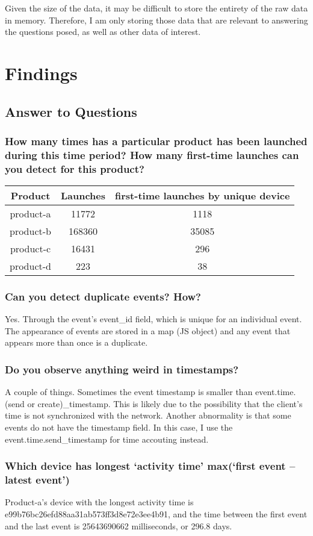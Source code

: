 \documentclass[12pt,letter]{article}
\begin{document}
  Given the size of the data, it may be difficult to store the entirety of the
  raw data in memory. Therefore, I am only storing those data that are relevant
  to answering the questions posed, as well as other data of interest.

  \section{Findings}
  \subsection{Answer to Questions}
  \subsubsection{How many times has a particular product has been launched during this time
  period? How many first-time launches can you detect for this product?}
  \begin{tabular}{c| c c}
      Product & Launches & first-time launches by unique device\\
      \hline
      product-a & 11772 & 1118 \\
      product-b & 168360 & 35085 \\
      product-c & 16431 & 296 \\
      product-d & 223 & 38\\
  \end{tabular}
  \subsubsection{Can you detect duplicate events? How?}
  Yes. Through the event's event\_id field, which is unique for an individual
  event. The appearance of events are stored in a map (JS object) and any event
  that appears more than once is a duplicate.
  \subsubsection{Do you observe anything weird in timestamps?}
  A couple of things. Sometimes the event timestamp is smaller than
  event.time.(send or create)\_timestamp. This is likely due to the possibility
  that the client's time is not synchronized with the network. Another
  abnormality is that some events do not have the timestamp field. In this case,
  I use the event.time.send\_timestamp for time accouting instead.
  \subsubsection{Which device has longest `activity time' max(`first event –
  latest event')}
  Product-a's device with the longest activity time is e99b76bc26efd88aa31ab573ff3d8e72e3ee4b91, and the
  time between the first event and the last event is 25643690662 milliseconds,
  or 296.8 days.
\end{document}
